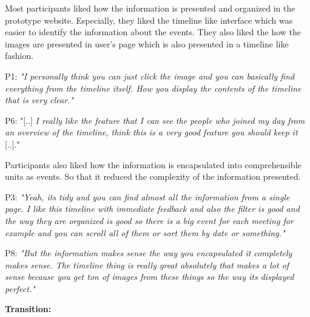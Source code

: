\documentclass[mscthesis]{usiinfthesis}
\begin{document}
Most participants liked how the information is presented and organized in the prototype website. Especially, they liked the timeline like interface which was easier to identify the information about the events. They also liked the how the images are presented in user's page which is also presented in a timeline like fashion.
\newline
\begin{adjustwidth}{1cm}{1cm}
\hspace{\parindent}P1: \textit{"I personally think you can just click the image and you can basically find everything from the timeline itself. How you display the contents of the timeline that is very clear."}

P6: "[..] \textit{I really like the feature that I can see the people who joined my day from an overview of the timeline, think this is a very good feature you should keep it }[..]."
\newline
\end{adjustwidth}
Participants also liked how the information is encapsulated into comprehensible units as events. So that it reduced the complexity of the information presented.
\newline
\begin{adjustwidth}{1cm}{1cm}
\hspace{\parindent}P3: \textit{"Yeah, its tidy and you can find almost all the information from a single page. I like this timeline with immediate feedback and also the filter is good and the way they are organized is good so there is a big event for each meeting for example and you can scroll all of them or sort them by date or something."}

P8: \textit{"But the information makes sense the way you encapsulated it completely makes sense. The timeline thing is really great absolutely that makes a lot of sense because you get ton of images from these things so the way its displayed perfect."}
\newline
\end{adjustwidth}
\textbf{Transition:}
\end{document}

